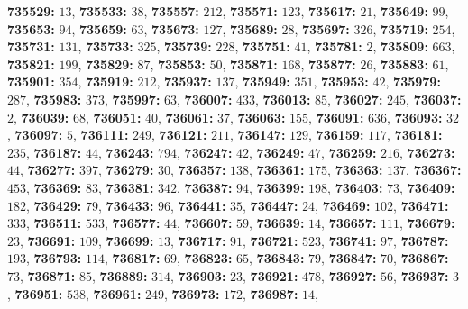 \textsf{\bfseries 735529:} $13$, \textsf{\bfseries 735533:} $38$, \textsf{\bfseries 735557:} $212$, \textsf{\bfseries 735571:} $123$, \textsf{\bfseries 735617:} $21$, \textsf{\bfseries 735649:} $99$, \textsf{\bfseries 735653:} $94$, \textsf{\bfseries 735659:} $63$, \textsf{\bfseries 735673:} $127$, \textsf{\bfseries 735689:} $28$, \textsf{\bfseries 735697:} $326$, \textsf{\bfseries 735719:} $254$, \textsf{\bfseries 735731:} $131$, \textsf{\bfseries 735733:} $325$, \textsf{\bfseries 735739:} $228$, \textsf{\bfseries 735751:} $41$, \textsf{\bfseries 735781:} $2$, \textsf{\bfseries 735809:} $663$, \textsf{\bfseries 735821:} $199$, \textsf{\bfseries 735829:} $87$, \textsf{\bfseries 735853:} $50$, \textsf{\bfseries 735871:} $168$, \textsf{\bfseries 735877:} $26$, \textsf{\bfseries 735883:} $61$, \textsf{\bfseries 735901:} $354$, \textsf{\bfseries 735919:} $212$, \textsf{\bfseries 735937:} $137$, \textsf{\bfseries 735949:} $351$, \textsf{\bfseries 735953:} $42$, \textsf{\bfseries 735979:} $287$, \textsf{\bfseries 735983:} $373$, \textsf{\bfseries 735997:} $63$, \textsf{\bfseries 736007:} $433$, \textsf{\bfseries 736013:} $85$, \textsf{\bfseries 736027:} $245$, \textsf{\bfseries 736037:} $2$, \textsf{\bfseries 736039:} $68$, \textsf{\bfseries 736051:} $40$, \textsf{\bfseries 736061:} $37$, \textsf{\bfseries 736063:} $155$, \textsf{\bfseries 736091:} $636$, \textsf{\bfseries 736093:} $32$, \textsf{\bfseries 736097:} $5$, \textsf{\bfseries 736111:} $249$, \textsf{\bfseries 736121:} $211$, \textsf{\bfseries 736147:} $129$, \textsf{\bfseries 736159:} $117$, \textsf{\bfseries 736181:} $235$, \textsf{\bfseries 736187:} $44$, \textsf{\bfseries 736243:} $794$, \textsf{\bfseries 736247:} $42$, \textsf{\bfseries 736249:} $47$, \textsf{\bfseries 736259:} $216$, \textsf{\bfseries 736273:} $44$, \textsf{\bfseries 736277:} $397$, \textsf{\bfseries 736279:} $30$, \textsf{\bfseries 736357:} $138$, \textsf{\bfseries 736361:} $175$, \textsf{\bfseries 736363:} $137$, \textsf{\bfseries 736367:} $453$, \textsf{\bfseries 736369:} $83$, \textsf{\bfseries 736381:} $342$, \textsf{\bfseries 736387:} $94$, \textsf{\bfseries 736399:} $198$, \textsf{\bfseries 736403:} $73$, \textsf{\bfseries 736409:} $182$, \textsf{\bfseries 736429:} $79$, \textsf{\bfseries 736433:} $96$, \textsf{\bfseries 736441:} $35$, \textsf{\bfseries 736447:} $24$, \textsf{\bfseries 736469:} $102$, \textsf{\bfseries 736471:} $333$, \textsf{\bfseries 736511:} $533$, \textsf{\bfseries 736577:} $44$, \textsf{\bfseries 736607:} $59$, \textsf{\bfseries 736639:} $14$, \textsf{\bfseries 736657:} $111$, \textsf{\bfseries 736679:} $23$, \textsf{\bfseries 736691:} $109$, \textsf{\bfseries 736699:} $13$, \textsf{\bfseries 736717:} $91$, \textsf{\bfseries 736721:} $523$, \textsf{\bfseries 736741:} $97$, \textsf{\bfseries 736787:} $193$, \textsf{\bfseries 736793:} $114$, \textsf{\bfseries 736817:} $69$, \textsf{\bfseries 736823:} $65$, \textsf{\bfseries 736843:} $79$, \textsf{\bfseries 736847:} $70$, \textsf{\bfseries 736867:} $73$, \textsf{\bfseries 736871:} $85$, \textsf{\bfseries 736889:} $314$, \textsf{\bfseries 736903:} $23$, \textsf{\bfseries 736921:} $478$, \textsf{\bfseries 736927:} $56$, \textsf{\bfseries 736937:} $3$, \textsf{\bfseries 736951:} $538$, \textsf{\bfseries 736961:} $249$, \textsf{\bfseries 736973:} $172$, \textsf{\bfseries 736987:} $14$, 
